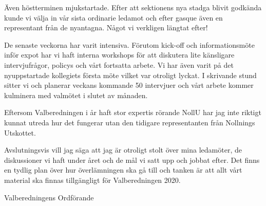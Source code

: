 \documentclass[../_main/handlingar.tex]{subfiles}
\begin{document}
\vspace{8px}

Även höstterminen mjukstartade. Efter att sektionens nya stadga blivit godkända kunde vi välja in vår sista ordinarie ledamot och efter gasque även en representant från de nyantagna. Något vi verkligen längtat efter!

De senaste veckorna har varit intensiva. Förutom kick-off och informationsmöte inför expot har vi haft interna workshops för att diskutera lite känsligare intervjufrågor, policys och vårt fortsatta arbete. Vi har även varit på det nyuppstartade kollegiets första möte vilket var otroligt lyckat. I skrivande stund sitter vi och planerar veckans kommande 50 intervjuer och vårt arbete kommer kulminera med valmötet i slutet av månaden.  

Eftersom Valberedningen i år haft stor expertis rörande NollU har jag inte riktigt kunnat utreda hur det fungerar utan den tidigare representanten från Nollnings Utskottet. 

Avslutningsvis vill jag säga att jag är otroligt stolt över mina ledamöter, de diskussioner vi haft under året och de mål vi satt upp och jobbat efter. Det finns en tydlig plan över hur överlämningen ska gå till och tanken är att allt vårt material ska finnas tillgängligt för Valberedningen 2020. 

\begin{signatures}{1}
    \mvh
    \signature{Axel Voss}{Valberedningens Ordförande}
\end{signatures}
\end{document}
